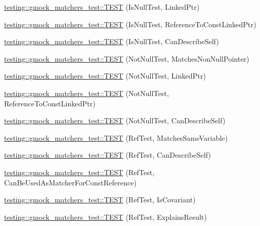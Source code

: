 \begin{DoxyCompactItemize}
\item 
\hyperlink{namespacetesting_1_1gmock__matchers__test_a0b1655e1640b7da6e1e7cc35074d9274}{testing\+::gmock\+\_\+matchers\+\_\+test\+::\+T\+E\+ST} (Is\+Null\+Test, Linked\+Ptr)
\item 
\hyperlink{namespacetesting_1_1gmock__matchers__test_afaaf0776096c0ad62de8236ab1b774d7}{testing\+::gmock\+\_\+matchers\+\_\+test\+::\+T\+E\+ST} (Is\+Null\+Test, Reference\+To\+Const\+Linked\+Ptr)
\item 
\hyperlink{namespacetesting_1_1gmock__matchers__test_a5ba91e0b79fcc0b17b1c1e373e741c38}{testing\+::gmock\+\_\+matchers\+\_\+test\+::\+T\+E\+ST} (Is\+Null\+Test, Can\+Describe\+Self)
\item 
\hyperlink{namespacetesting_1_1gmock__matchers__test_a694ea33511eab7822b88d8e74b388534}{testing\+::gmock\+\_\+matchers\+\_\+test\+::\+T\+E\+ST} (Not\+Null\+Test, Matches\+Non\+Null\+Pointer)
\item 
\hyperlink{namespacetesting_1_1gmock__matchers__test_aec956599ef91df968fec972247c7a28a}{testing\+::gmock\+\_\+matchers\+\_\+test\+::\+T\+E\+ST} (Not\+Null\+Test, Linked\+Ptr)
\item 
\hyperlink{namespacetesting_1_1gmock__matchers__test_a9e9560feb52f60475f653c15cc7466aa}{testing\+::gmock\+\_\+matchers\+\_\+test\+::\+T\+E\+ST} (Not\+Null\+Test, Reference\+To\+Const\+Linked\+Ptr)
\item 
\hyperlink{namespacetesting_1_1gmock__matchers__test_a68da7653e6a480c60a3a03fe8afb20fc}{testing\+::gmock\+\_\+matchers\+\_\+test\+::\+T\+E\+ST} (Not\+Null\+Test, Can\+Describe\+Self)
\item 
\hyperlink{namespacetesting_1_1gmock__matchers__test_a199983108927dadee9bd2e03ddd6057d}{testing\+::gmock\+\_\+matchers\+\_\+test\+::\+T\+E\+ST} (Ref\+Test, Matches\+Same\+Variable)
\item 
\hyperlink{namespacetesting_1_1gmock__matchers__test_ad8fc5a82cbb4b5b8147798be06d7059b}{testing\+::gmock\+\_\+matchers\+\_\+test\+::\+T\+E\+ST} (Ref\+Test, Can\+Describe\+Self)
\item 
\hyperlink{namespacetesting_1_1gmock__matchers__test_af1e64d057f2c46cc17f1c96a075cde6b}{testing\+::gmock\+\_\+matchers\+\_\+test\+::\+T\+E\+ST} (Ref\+Test, Can\+Be\+Used\+As\+Matcher\+For\+Const\+Reference)
\item 
\hyperlink{namespacetesting_1_1gmock__matchers__test_a03b45cf0f65f33208ac378b8603ff67a}{testing\+::gmock\+\_\+matchers\+\_\+test\+::\+T\+E\+ST} (Ref\+Test, Is\+Covariant)
\item 
\hyperlink{namespacetesting_1_1gmock__matchers__test_ab73595bcf8dd511b519b640248136ccd}{testing\+::gmock\+\_\+matchers\+\_\+test\+::\+T\+E\+ST} (Ref\+Test, Explains\+Result)

\end{DoxyCompactItemize}
